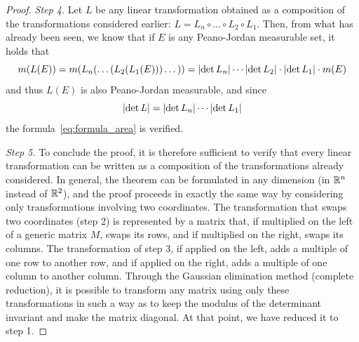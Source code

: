 \begin{proof}
\emph{Step 4.}
Let $L$ be any linear transformation obtained as a composition of the
transformations considered earlier: $L= L_n\circ \dots  \circ L_2 \circ L_1$.
Then, from what has already been seen, we know that if $E$ is any Peano-Jordan
measurable set, it holds that
\[
m(L(E)) = m{\left( L_n(\dots(L_2(L_1(E)))\dots) \right)}
     = {\left|\det L_n\right|} \cdots {\left|\det L_2\right|} \cdot {\left|\det L_1\right|} \cdot m(E)
\]
and thus $L(E)$ is also Peano-Jordan measurable, and since
\[
 {\left|\det L\right|} = {\left|\det L_n\right|} \cdots {\left|\det L_1\right|}
\]
the formula~\eqref{eq:formula_area} is verified.

\emph{Step 5.}
To conclude the proof, it is therefore sufficient to verify that every linear
transformation can be written as a composition of the transformations already
considered. In general, the theorem can be formulated in any dimension (in
${\mathbb R}^n$ instead of ${\mathbb R}^2$), and the proof proceeds in exactly the same way by
considering only transformations involving two coordinates. The transformation
that swaps two coordinates (step 2) is represented by a matrix that, if
multiplied on the left of a generic matrix $M$, swaps its rows, and if
multiplied on the right, swaps its columns. The transformation of step 3, if
applied on the left, adds a multiple of one row to another row, and if applied
on the right, adds a multiple of one column to another column. Through the
Gaussian elimination method (complete reduction), it is possible to transform
any matrix using only these transformations in such a way as to keep the modulus
of the determinant invariant and make the matrix diagonal. At that point, we
have reduced it to step 1.


\end{proof}
